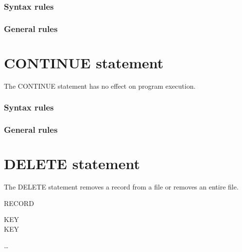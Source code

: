 \subsubsection{Syntax rules}

\subsubsection{General rules}

\section{CONTINUE statement}

The CONTINUE statement has no effect on program execution.

\begin{syntax}
\end{syntax}

\subsubsection{Syntax rules}

\subsubsection{General rules}

\section{DELETE statement}

The DELETE statement removes a record from a file or removes an entire file.

\begin{syntax}
   \filename RECORD

  \begin{0-1}
  \end{0-1}

  \begin{0+}
     KEY \imperativestatement \\
      KEY \imperativestatement
  \end{0+}

  \begin{0-1}
  \end{0-1}
\end{syntax}

\begin{syntax}[\miscextcolour]
   
  \begin{1=}
    \filename
  \end{1=} \ldots
\end{syntax}

